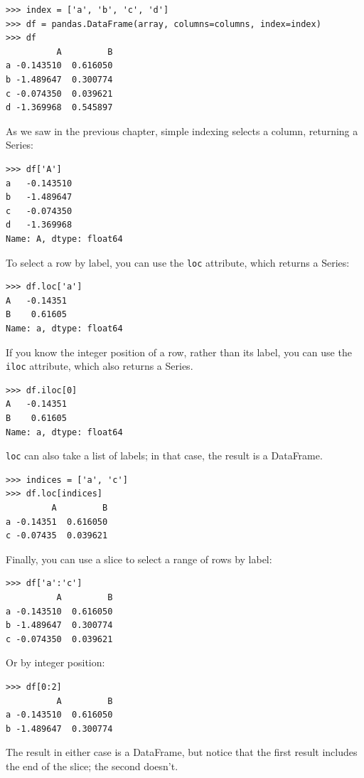\documentclass[12pt]{book}
\begin{document}
\begin{verbatim}
>>> index = ['a', 'b', 'c', 'd']
>>> df = pandas.DataFrame(array, columns=columns, index=index)
>>> df
          A         B
a -0.143510  0.616050
b -1.489647  0.300774
c -0.074350  0.039621
d -1.369968  0.545897
\end{verbatim}

As we saw in the previous chapter, simple indexing selects a
column, returning a Series:

\begin{verbatim}
>>> df['A']
a   -0.143510
b   -1.489647
c   -0.074350
d   -1.369968
Name: A, dtype: float64
\end{verbatim}

To select a row by label, you can use the {\tt loc} attribute, which
returns a Series:

\begin{verbatim}
>>> df.loc['a']
A   -0.14351
B    0.61605
Name: a, dtype: float64
\end{verbatim}

If you know the integer position of a row, rather than its label, you
can use the {\tt iloc} attribute, which also returns a Series.

\begin{verbatim}
>>> df.iloc[0]
A   -0.14351
B    0.61605
Name: a, dtype: float64
\end{verbatim}

{\tt loc} can also take a list of labels; in that case,
the result is a DataFrame.

\begin{verbatim}
>>> indices = ['a', 'c']
>>> df.loc[indices]
         A         B
a -0.14351  0.616050
c -0.07435  0.039621
\end{verbatim}

Finally, you can use a slice to select a range of rows by label:

\begin{verbatim}
>>> df['a':'c']
          A         B
a -0.143510  0.616050
b -1.489647  0.300774
c -0.074350  0.039621
\end{verbatim}

Or by integer position:

\begin{verbatim}
>>> df[0:2]
          A         B
a -0.143510  0.616050
b -1.489647  0.300774
\end{verbatim}

The result in either case is a DataFrame, but notice that the first
result includes the end of the slice; the second doesn't.
\end{document}
